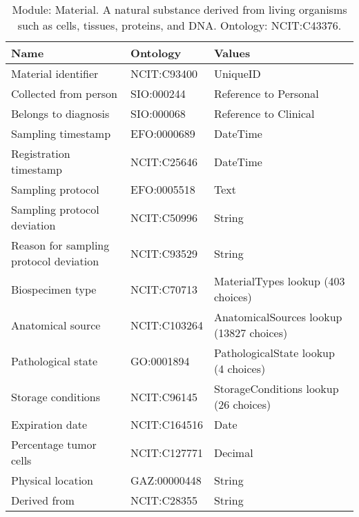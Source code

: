\documentclass{article}
\begin{document}
\begin{table}[htb]
\begin{tabular}{lll}
Name & Ontology & Values \\
\hline
Material identifier & NCIT:C93400 & UniqueID \\
Collected from person & SIO:000244 & Reference to Personal \\
Belongs to diagnosis & SIO:000068 & Reference to Clinical \\
Sampling timestamp & EFO:0000689 & DateTime \\
Registration timestamp & NCIT:C25646 & DateTime \\
Sampling protocol & EFO:0005518 & Text \\
Sampling protocol deviation & NCIT:C50996 & String \\
Reason for sampling protocol deviation & NCIT:C93529 & String \\
Biospecimen type & NCIT:C70713 & MaterialTypes lookup (403 choices) \\
Anatomical source & NCIT:C103264 & AnatomicalSources lookup (13827 choices) \\
Pathological state & GO:0001894 & PathologicalState lookup (4 choices) \\
Storage conditions & NCIT:C96145 & StorageConditions lookup (26 choices) \\
Expiration date & NCIT:C164516 & Date \\
Percentage tumor cells & NCIT:C127771 & Decimal \\
Physical location & GAZ:00000448 & String \\
Derived from & NCIT:C28355 & String \\
\hline
\end{tabular}
\caption[Module: Material]{\label{table:table7} Module: Material. A natural substance derived from living organisms such as cells, tissues, proteins, and DNA. Ontology: NCIT:C43376. }
\end{table}
\end{document}
